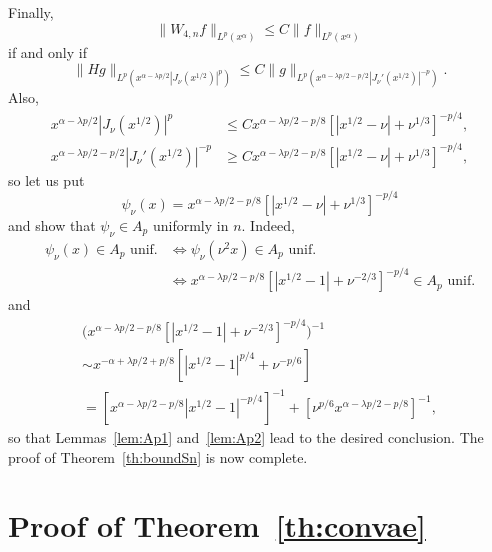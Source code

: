 \documentclass[reqno]{amsart}
\theoremstyle{plain}
\theoremstyle{definition}
\theoremstyle{remark}
\newcommand{\lpnorm}[3]{\|{#1}\|_{L^{#2}({#3})}} %
\begin{document}
Finally,
\begin{equation*}
   \lpnorm{W_{4,n}f}p{x^\alpha} \le C \lpnorm{f}p{x^\alpha}
\end{equation*}
if and only if
\begin{equation*}
   \lpnorm{Hg}p{x^{\alpha - \lambda p/2} |J_\nu(x^{1/2})|^p}
    \le C \lpnorm{g}p{x^{\alpha - \lambda p/2 - p/2} |J_\nu'(x^{1/2})|^{-p}}.
\end{equation*}
Also,
\begin{align*}
   x^{\alpha - \lambda p/2} |J_\nu(x^{1/2})|^p
   &\le C x^{\alpha - \lambda p/2 - p/8}
   \left[|x^{1/2} - \nu| + \nu^{1/3} \right]^{-p/4},
   \\
   x^{\alpha - \lambda p/2 - {p/2}} |J_\nu'(x^{1/2})|^{-p}
   &\ge C x^{\alpha - \lambda p/2 - p/8}
   \left[|x^{1/2} - \nu| + \nu^{1/3} \right]^{-p/4},
\end{align*}
so let us put
\begin{equation*}
   \psi_\nu(x) = x^{\alpha - \lambda p/2 - p/8}
   \left[ |x^{1/2} - \nu| + \nu^{1/3} \right]^{-p/4}
\end{equation*}
and show that $\psi_\nu \in A_p$ uniformly in $n$. Indeed,
\begin{align*}
   \psi_\nu(x) \in A_p {\text{ unif.}}
   &\iff \psi_\nu(\nu^2 x) \in A_p {\text{ unif.}}
   \\
   &\iff x^{\alpha - \lambda p/2 - p/8}
   \left[ |x^{1/2} - 1| + \nu^{-2/3} \right]^{-p/4} \in A_p {\text{ unif.}}
\end{align*}
and
\begin{multline*}
   \Big(x^{\alpha - \lambda p/2 - p/8}
   \left[ |x^{1/2} - 1| + \nu^{-2/3} \right]^{-p/4}
   \Big)^{-1}
   \\
   \sim x^{-\alpha + \lambda p/2 + p/8}
   \left[|x^{1/2} - 1|^{p/4} + \nu^{-p/6} \right]
   \\
   = \left[x^{\alpha - \lambda p/2 - p/8}
   |x^{1/2} - 1|^{-p/4} \right]^{-1}
   + \left[ \nu^{p/6} x^{\alpha - \lambda p/2 - p/8}
   \right]^{-1},
\end{multline*}
so that Lemmas~\ref{lem:Ap1} and~\ref{lem:Ap2} lead to the desired conclusion.
The proof of Theorem~\ref{th:boundSn} is now complete.

\section{Proof of Theorem~\ref{th:convae}}
\label{sec:proofconvae}
\end{document}
